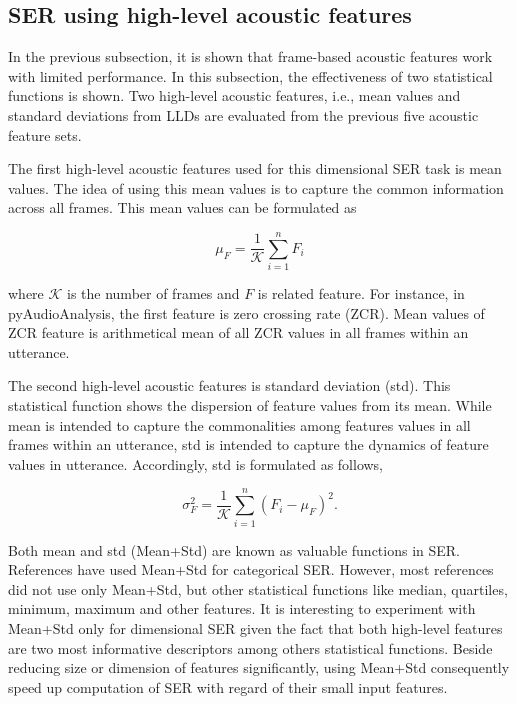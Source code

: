 
\subsection{SER using high-level acoustic features}
In the previous subsection, it is shown that frame-based acoustic features work
with limited performance. In this subsection, the effectiveness of two
statistical functions is shown. Two high-level acoustic features, i.e., mean
values and standard deviations from LLDs are evaluated from the previous five
acoustic feature sets. 

The first high-level acoustic features used for this dimensional SER task is
mean values. The idea of using this mean values is to capture the common
information across all frames. This mean values can be formulated as

\begin{equation}
  \mu_F = \frac{1}{\mathcal{K}}\sum _{i=1}^n F_i  
\end{equation}

\noindent where $\mathcal{K}$ is the number of frames and $F$ is related
feature.  For instance, in pyAudioAnalysis, the first feature is zero crossing
rate (ZCR).  Mean values of ZCR feature is arithmetical mean of all ZCR values
in all frames within an utterance.  

The second high-level acoustic features is standard deviation (std). This
statistical function shows the dispersion of feature values from its mean.
While mean is intended to capture the commonalities among features values in
all frames within an utterance, std is intended to capture the dynamics of
feature values in utterance. Accordingly, std is formulated as follows, 

\begin{equation}
  \sigma_F^2 = \frac{1}{\mathcal{K}}\sum _{i=1}^n (F_i - \mu_F)^2.
\end{equation}

Both mean and std (Mean+Std) are known as valuable functions in SER.
References \cite{Sebastian2019, Morales2016, Tomas2019} have used
Mean+Std for categorical SER. However, most references did not use only
Mean+Std, but other statistical functions like median, quartiles, minimum,
maximum and other features. It is interesting to experiment with Mean+Std only
for dimensional SER given the fact that both high-level features are two most
informative descriptors among others statistical functions. Beside reducing
size or dimension of features significantly, using Mean+Std consequently speed
up computation of SER with regard of their small input features.

